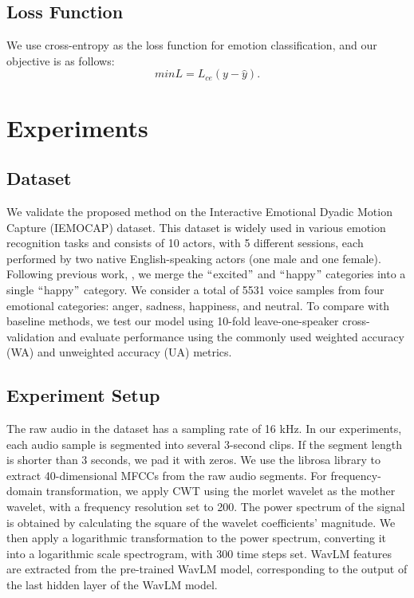 \documentclass[runningheads]{llncs}
\begin{document}
\subsection{Loss Function}
We use cross-entropy as the loss function for emotion classification, and our objective is as follows:
\begin{equation}
min L=L_{ce}(y-\hat{y}).
\end{equation}


\section{Experiments}
\subsection{Dataset}
We validate the proposed method on the Interactive Emotional Dyadic Motion Capture (IEMOCAP)\cite{b20} dataset. This dataset is widely used in various emotion recognition tasks and consists of 10 actors, with 5 different sessions, each performed by two native English-speaking actors (one male and one female). Following previous work\cite{b19}, \cite{b16}, we merge the $``$excited$"$ and $``$happy$"$ categories into a single $``$happy$"$ category. We consider a total of 5531 voice samples from four emotional categories: anger, sadness, happiness, and neutral. To compare with baseline methods, we test our model using 10-fold leave-one-speaker cross-validation and evaluate performance using the commonly used weighted accuracy (WA) and unweighted accuracy (UA) metrics.

\subsection{Experiment Setup}
The raw audio in the dataset has a sampling rate of 16 kHz. In our experiments, each audio sample is segmented into several 3-second clips. If the segment length is shorter than 3 seconds, we pad it with zeros. We use the librosa library to extract 40-dimensional MFCCs from the raw audio segments. For frequency-domain transformation, we apply CWT using the morlet wavelet as the mother wavelet, with a frequency resolution set to 200. The power spectrum of the signal is obtained by calculating the square of the wavelet coefficients' magnitude. We then apply a logarithmic transformation to the power spectrum, converting it into a logarithmic scale spectrogram, with 300 time steps set. WavLM features are extracted from the pre-trained WavLM model, corresponding to the output of the last hidden layer of the WavLM model.
\end{document}
